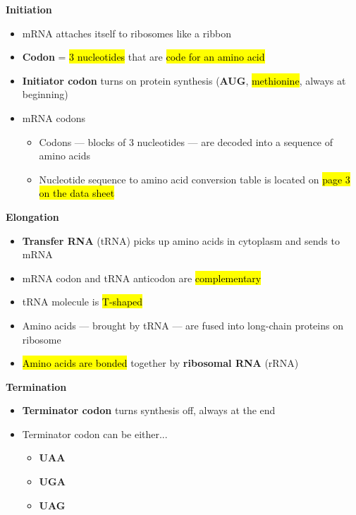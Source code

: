 \documentclass[a4paper,12pt]{article}
\begin{document}
\textbf{Initiation}
\begin{itemize}
    \item{mRNA attaches itself to ribosomes like a ribbon}
    \item{\textbf{Codon} = \hl{3 nucleotides} that are \hl{code for an amino acid}}
    \item{\textbf{Initiator codon} turns on protein synthesis (\textbf{AUG}, \hl{methionine}, always at beginning)}
    \item{
            mRNA codons
            \begin{itemize}
                \item{Codons --- blocks of 3 nucleotides --- are decoded into a sequence of amino acids}
                \item{Nucleotide sequence to amino acid conversion table is located on \hl{page 3 on the data sheet}}
            \end{itemize}
        }
\end{itemize}

\textbf{Elongation}
\begin{itemize}
    \item{\textbf{Transfer RNA} (tRNA) picks up amino acids in cytoplasm and sends to mRNA}
    \item{mRNA codon and tRNA anticodon are \hl{complementary}}
    \item{tRNA molecule is \hl{T-shaped}}
    \item{Amino acids --- brought by tRNA --- are fused into long-chain proteins on ribosome}
    \item{\hl{Amino acids are bonded} together by \textbf{ribosomal RNA} (rRNA)}
\end{itemize}

\textbf{Termination}
\begin{itemize}
    \item{\textbf{Terminator codon} turns synthesis off, always at the end}
    \item{
            Terminator codon can be either...
            \begin{itemize}
                \item{\textbf{UAA}}
                \item{\textbf{UGA}}
                \item{\textbf{UAG}}
            \end{itemize}
        }
\end{itemize}
\end{document}
